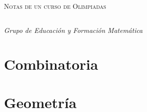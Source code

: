\documentclass[letterpaper,11pt,oneside]{book}
\theoremstyle{definition}
\theoremstyle{remark}
\begin{document}
	
	\begin{titlepage}
		\begin{center}
			\begin{Huge}
				\textsc{Notas de un curso de Olimpiadas}
			\end{Huge}
		\end{center}
	\end{titlepage}
	
	\thispagestyle{empty} %
	
	\chapter*{}
	\begin{flushright}
\textit{Grupo de Educación y Formación Matemática}
	\end{flushright}
	
	
	
	\tableofcontents
	
	\thispagestyle{empty} %
	
	
	\part{Combinatoria}\label{cap_conteo_y_probabilidad}
	
	
	
	
	\part{Geometr\'ia}
	
	
	
\end{document}
